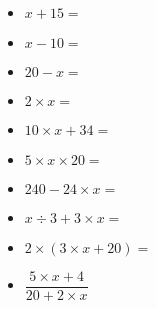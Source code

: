 \begin{multicols}{3}
  \begin{itemize}[label={$\bullet$}]
    \item $x + 15 = $ \dotfill
    \item $x - 10 = $ \dotfill
    \item $20 - x = $ \dotfill
    \item $2 \times x = $ \dotfill
    \item $10 \times x + 34 = $ \dotfill
    \item $5 \times  x \times 20 = $ \dotfill
    \item $240 - 24 \times x = $ \dotfill
    \item $x \div 3 + 3 \times x = $ \dotfill
    \item $2 \times (3  \times x + 20) = $ \dotfill
    \item $\dfrac{5 \times x + 4}{20 + 2 \times x}$ \dotfill
  \end{itemize}
  
  \end{multicols}


  \vspace{0.5cm}

